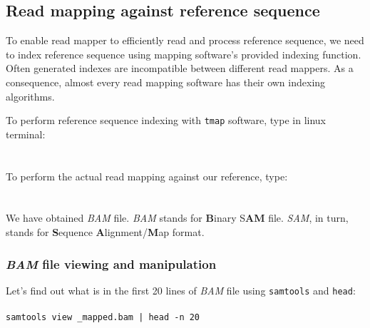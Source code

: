 \subsection{Read mapping against reference sequence}

To enable read mapper to efficiently read and process reference sequence, we need to
index reference sequence using mapping software's provided indexing function. Often generated
indexes are incompatible between different read mappers. As a consequence, almost every read
mapping software has their own indexing algorithms.

To perform reference sequence indexing with \texttt{tmap} software, type in linux terminal:\\~\\
\texttt{}\\

To perform the actual read mapping against our reference, type:\\~\\
\\

We have obtained \textit{BAM} file. \textit{BAM} stands for \textbf{B}inary S\textbf{AM} file.
\textit{SAM}, in turn, stands for \textbf{S}equence \textbf{A}lignment/\textbf{M}ap format.

\subsubsection{\textit{BAM} file viewing and manipulation}
Let's find out what is in the first 20 lines of \textit{BAM} file using \texttt{samtools} and \texttt{head}:\\~\\
\texttt{samtools view \mapReads\_mapped.bam | head -n 20}\\

